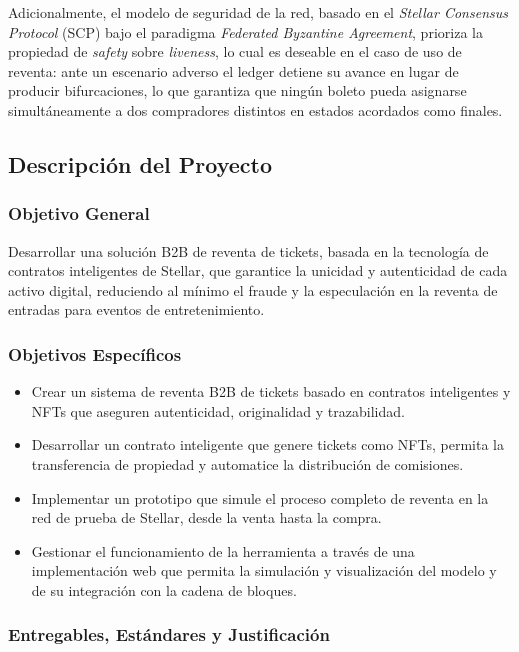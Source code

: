 Adicionalmente, el modelo de seguridad de la red, basado en el \textit{Stellar Consensus Protocol} (SCP) bajo el paradigma \textit{Federated Byzantine Agreement}, prioriza la propiedad de \textit{safety} sobre \textit{liveness}, lo cual es deseable en el caso de uso de reventa: ante un escenario adverso el ledger detiene su avance en lugar de producir bifurcaciones, lo que garantiza que ningún boleto pueda asignarse simultáneamente a dos compradores distintos en estados acordados como finales.

\subsection{Descripción del Proyecto}

\subsubsection{Objetivo General}

Desarrollar una solución B2B de reventa de tickets, basada en la tecnología de contratos inteligentes de Stellar, que garantice la unicidad y autenticidad de cada activo digital, reduciendo al mínimo el fraude y la especulación en la reventa de entradas para eventos de entretenimiento.

\subsubsection{Objetivos Específicos}

\begin{itemize}\setlength{\itemsep}{2pt}
    \item Crear un sistema de reventa B2B de tickets basado en contratos inteligentes y NFTs que aseguren autenticidad, originalidad y trazabilidad.
    \item Desarrollar un contrato inteligente que genere tickets como NFTs, permita la transferencia de propiedad y automatice la distribución de comisiones.
    \item Implementar un prototipo que simule el proceso completo de reventa en la red de prueba de Stellar, desde la venta hasta la compra.
    \item Gestionar el funcionamiento de la herramienta a través de una implementación web que permita la simulación y visualización del modelo y de su integración con la cadena de bloques.
\end{itemize}

\subsubsection{Entregables, Estándares y Justificación}

